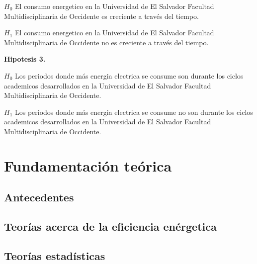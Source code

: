 \documentclass[12pt,letterpaper]{report}
\begin{document}
$H_0$ El consumo energetico en la Universidad de El Salvador Facultad Multidisciplinaria de Occidente es creciente a través del tiempo.

$H_1$ El consumo energetico en la Universidad de El Salvador Facultad Multidisciplinaria de Occidente no es creciente a través del tiempo.


\textbf{ Hipotesis 3.}

$H_0$ Los periodos donde más energia electrica se consume son durante los ciclos academicos desarrollados en la Universidad de El Salvador Facultad Multidisciplinaria de Occidente. 

$H_1$ Los periodos donde más energia electrica se consume no son durante los ciclos academicos desarrollados en la Universidad de El Salvador Facultad Multidisciplinaria de Occidente.





\chapter{Fundamentación teórica}
\section{Antecedentes}
\section{Teorías acerca de la eficiencia enérgetica}
\section{Teorías estadísticas}

\nocite{*}


\end{document}
